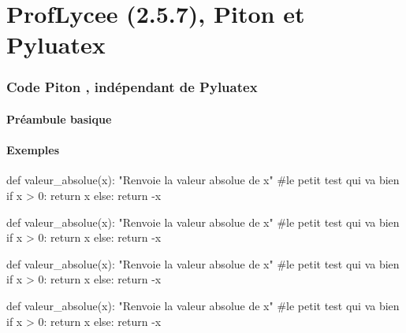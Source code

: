 \documentclass[french,a4paper,10pt]{article}
\def\PLver{2.5.7}
\begin{document}
\part*{ProfLycee (\PLver), Piton et Pyluatex}

\section{Code \og Piton \fg{}, indépendant de Pyluatex}

\subsection{Préambule basique}

{\small {}}

\subsection{Exemples}

{\small \begin{codehigh}
\begin{CodePiton}
def valeur_absolue(x):
    "Renvoie la valeur absolue de x"
    #le petit test qui va bien
    if x > 0:
        return x
    else:
    return -x
\end{CodePiton}
\end{codehigh}}

\begin{CodePiton}
def valeur_absolue(x):
	"Renvoie la valeur absolue de x"
	#le petit test qui va bien
	if x > 0:
		return x
	else:
		return -x
\end{CodePiton}

{\small \begin{codehigh}
\begin{CodePiton}[Style=Classique,Largeur=10cm]
def valeur_absolue(x):
    "Renvoie la valeur absolue de x"
    #le petit test qui va bien
    if x > 0:
        return x
    else:
    return -x
\end{CodePiton}
\end{codehigh}}

\begin{CodePiton}[Style=Classique,Largeur=10cm]
def valeur_absolue(x):
	"Renvoie la valeur absolue de x"
	#le petit test qui va bien
	if x > 0:
		return x
	else:
		return -x
\end{CodePiton}
\end{document}
